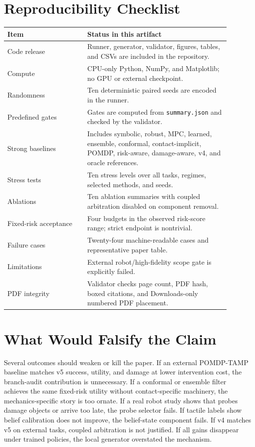 \documentclass{article}
\begin{document}
\clearpage
\section{Reproducibility Checklist}
\begin{longtable}{p{0.32\linewidth}p{0.58\linewidth}}
\toprule
Item & Status in this artifact \\
\midrule
Code release & Runner, generator, validator, figures, tables, and CSVs are included in the repository. \\
Compute & CPU-only Python, NumPy, and Matplotlib; no GPU or external checkpoint. \\
Randomness & Ten deterministic paired seeds are encoded in the runner. \\
Predefined gates & Gates are computed from \texttt{summary.json} and checked by the validator. \\
Strong baselines & Includes symbolic, robust, MPC, learned, ensemble, conformal, contact-implicit, POMDP, risk-aware, damage-aware, v4, and oracle references. \\
Stress tests & Ten stress levels over all tasks, regimes, selected methods, and seeds. \\
Ablations & Ten ablation summaries with coupled arbitration disabled on component removal. \\
Fixed-risk acceptance & Four budgets in the observed risk-score range; strict endpoint is nontrivial. \\
Failure cases & Twenty-four machine-readable cases and representative paper table. \\
Limitations & External robot/high-fidelity scope gate is explicitly failed. \\
PDF integrity & Validator checks page count, PDF hash, boxed citations, and Downloads-only numbered PDF placement. \\
\bottomrule
\end{longtable}

\section{What Would Falsify the Claim}
Several outcomes should weaken or kill the paper. If an external POMDP-TAMP baseline matches v5 success, utility, and damage at lower intervention cost, the branch-audit contribution is unnecessary. If a conformal or ensemble filter achieves the same fixed-risk utility without contact-specific machinery, the mechanics-specific story is too ornate. If a real robot study shows that probes damage objects or arrive too late, the probe selector fails. If tactile labels show belief calibration does not improve, the belief-state component fails. If v4 matches v5 on external tasks, coupled arbitration is not justified. If all gains disappear under trained policies, the local generator overstated the mechanism.
\end{document}
